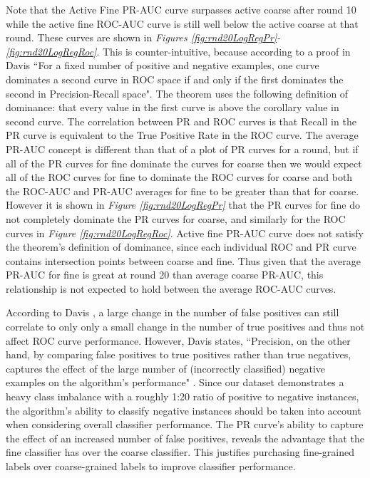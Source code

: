 \documentclass[ms]{nuthesis}
\begin{document}
\par Note that the Active Fine PR-AUC curve
surpasses active coarse after round 10 while the active fine ROC-AUC curve is still well below the
 active coarse at that round. These curves are shown in \textit{Figures \ref{fig:rnd20LogRegPr}-\ref{fig:rnd20LogRegRoc}}. This is counter-intuitive, because according to a proof in Davis \cite{DavisRocPr}
 ``For a fixed number of positive and negative examples, one curve dominates a second curve in
 ROC space if and only if the first dominates the second in Precision-Recall space". The theorem uses the
 following definition of dominance: that every value in the first curve is above the corollary value in
 second curve. The correlation between PR and ROC curves is that Recall in the PR curve is equivalent to
 the True Positive Rate in the ROC curve. The average PR-AUC concept is different than that of a plot of
 PR curves for a round, but if all of the PR curves for fine dominate the curves for coarse then we would
  expect all of the ROC curves for fine to dominate the ROC curves for coarse and both the ROC-AUC and PR-AUC
   averages for fine to be greater than that for coarse. However it is shown in \textit{Figure \ref{fig:rnd20LogRegPr}}
   that the PR curves for fine do not completely dominate the PR curves for coarse, and similarly for the ROC curves
   in \textit{Figure \ref{fig:rnd20LogRegRoc}}. Active fine PR-AUC curve does not satisfy the theorem's
   definition of dominance, since each individual ROC and PR curve contains intersection points between
   coarse and fine. Thus given that the average PR-AUC for fine is great at round 20 than average coarse PR-AUC,
   this relationship is not expected to hold between the average ROC-AUC curves.
   \par According to Davis \cite{DavisRocPr}, a large change in the number of false
   positives can still correlate to only only a small change in the
   number of true positives and thus not affect ROC curve performance. However,
   Davis states, ``Precision, on the other hand, by comparing false
   positives to true positives rather than true
   negatives, captures the effect of the large number
    of (incorrectly classified) negative examples on the
   algorithm's performance" \cite{DavisRocPr}. Since our dataset demonstrates a heavy class imbalance with
    a roughly 1:20 ratio of positive to negative instances, the algorithm's ability
    to classify negative instances
    should be taken into account when considering overall classifier performance.
    The PR curve's ability to capture
    the effect of an increased number of false positives, reveals the advantage that the fine
    classifier has over the coarse classifier. This justifies purchasing
    fine-grained labels over coarse-grained labels
    to improve classifier performance.
\end{document}
